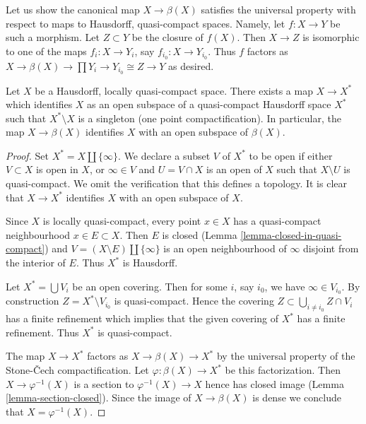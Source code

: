 \medskip\noindent
Let us show the canonical map $X \to \beta(X)$ satisfies the universal
property with respect to maps to Hausdorff, quasi-compact spaces. Namely,
let $f : X \to Y$ be such a morphism. Let $Z \subset Y$ be the closure
of $f(X)$. Then $X \to Z$ is isomorphic to one of the maps
$f_i : X \to Y_i$, say $f_{i_0} : X \to Y_{i_0}$. Thus $f$ factors as
$X \to \beta(X) \to \prod Y_i \to Y_{i_0} \cong Z \to Y$ as desired.

\begin{lemma}
\label{lemma-one-point-compactification}
Let $X$ be a Hausdorff, locally quasi-compact space.
There exists a map $X \to X^*$ which identifies $X$ as an open
subspace of a quasi-compact Hausdorff space $X^*$ such that
$X^* \setminus X$ is a singleton (one point compactification).
In particular, the map $X \to \beta(X)$ identifies $X$
with an open subspace of $\beta(X)$.
\end{lemma}

\begin{proof}
Set $X^* = X \amalg \{\infty\}$. We declare a subset $V$ of $X^*$ to be
open if either $V \subset X$ is open in $X$, or $\infty \in V$ and
$U = V \cap X$ is an open of $X$ such that $X \setminus U$ is quasi-compact.
We omit the verification that this defines a topology. It is clear
that $X \to X^*$ identifies $X$ with an open subspace of $X$.

\medskip\noindent
Since $X$ is locally quasi-compact, every point $x \in X$ has a
quasi-compact neighbourhood $x \in E \subset X$. Then $E$
is closed (Lemma \ref{lemma-closed-in-quasi-compact}) and
$V = (X \setminus E) \amalg \{\infty\}$ is an open neighbourhood
of $\infty$ disjoint from the interior of $E$. Thus $X^*$ is Hausdorff.

\medskip\noindent
Let $X^* = \bigcup V_i$ be an open covering. Then for some $i$, say $i_0$,
we have $\infty \in V_{i_0}$. By construction $Z = X^* \setminus V_{i_0}$
is quasi-compact. Hence the covering
$Z \subset \bigcup_{i \not = i_0} Z \cap V_i$ has a finite refinement which
implies that the given covering of $X^*$ has a finite refinement.
Thus $X^*$ is quasi-compact.

\medskip\noindent
The map $X \to X^*$ factors as $X \to \beta(X) \to X^*$ by the universal
property of the Stone-{\v C}ech compactification. Let
$\varphi : \beta(X) \to X^*$ be this factorization.
Then $X \to \varphi^{-1}(X)$ is a section to
$\varphi^{-1}(X) \to X$ hence has closed image
(Lemma \ref{lemma-section-closed}).
Since the image of $X \to \beta(X)$ is dense we conclude that
$X = \varphi^{-1}(X)$.
\end{proof}











